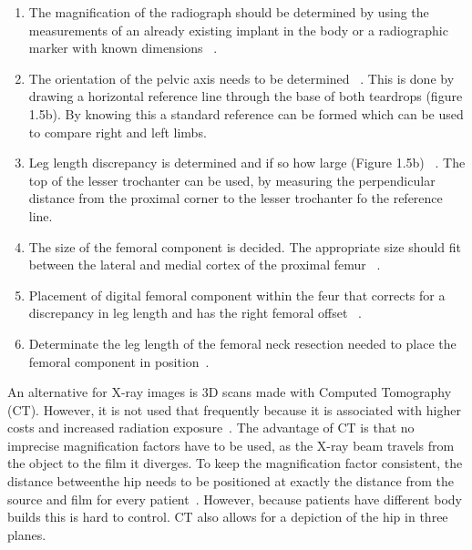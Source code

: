 \documentclass[whitelogo]{tudelft-report}
\begin{document}
{\begin{enumerate}
		\item The magnification of the radiograph should be determined by using the measurements of an already existing implant in the body or a radiographic marker with known dimensions ~\cite{ bono2004digital}.   
		\item The orientation of the pelvic axis needs to be determined ~\cite{ bono2004digital}. This is done by drawing a horizontal reference line through the base of both teardrops (figure 1.5b). By knowing this a standard reference can be formed which can be used to compare right and left limbs. 
		\item Leg length discrepancy is determined and if so how large (Figure 1.5b) ~\cite{ bono2004digital}. The top of the lesser trochanter can be used, by measuring the perpendicular distance from the proximal corner to the lesser trochanter fo the reference line.
		\item The size of the femoral component is decided. The appropriate size should fit between the lateral and medial cortex of the proximal femur ~\cite{ bono2004digital}. 
		\item Placement of digital femoral component within the feur that corrects for a discrepancy in leg length and has the right femoral offset ~\cite{ bono2004digital}.
		\item Determinate the leg length of the femoral neck resection needed to place the femoral component in position~\cite{ bono2004digital}.
		\setcounter{enumTemp}{\theenumi}
	\end{enumerate}


An alternative for X-ray images is 3D scans made with Computed Tomography (CT). However, it is not used that frequently because it is associated with higher costs and increased radiation exposure~\cite{huppertz2011computed}. The advantage of CT is that no imprecise magnification factors have to be used, as the X-ray beam travels from the object to the film it diverges. To keep the magnification factor consistent, the distance betweenthe hip needs to be positioned at exactly the distance from the source and film for every patient~\cite{scheerlinck2010primary}. However, because patients have different body builds this is hard to control. CT also allows for a depiction of the hip in three planes.  

}
\end{document}
